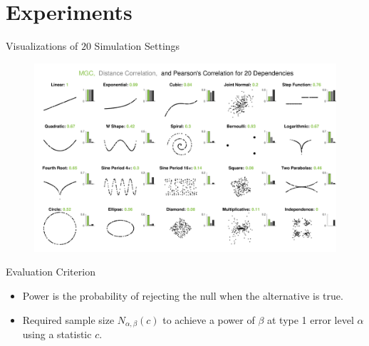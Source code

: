 \documentclass[mathserif,t]{beamer}
\newcommand{\Mgc}{MGC}
\newcommand{\mbx}{X}
\newcommand{\mby}{Y}
\begin{document}






\section{Experiments}
\begin{frame}{Visualizations of $20$ Simulation Settings}
\pause
\begin{figure}[ht]
  \centering
  \includegraphics[width=1.0\textwidth]{FigSimVisual2}
	\label{f:dependencies}
\end{figure}
\end{frame}

\begin{frame}{Evaluation Criterion}
\begin{itemize}[<+->]
\item Power is the probability of rejecting the null when the alternative is true.
\item Required sample size $N_{\alpha,\beta}(c)$ to achieve a power of $\beta$ at type 1 error level $\alpha$ using a statistic $c$. 
\end{itemize}
\end{frame}
\end{document}
